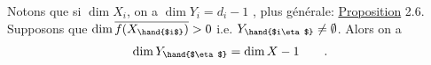 Notons que si  $\dim X_i$,  on a $\dim Y_i = d_i-1$ ,  plus générale:
\uline{Proposition} 2.6. Supposons que  $\dim \overline{f(X_{\hand{$i$}})} > 0$ i.e. $Y_{\hand{$i\eta$}} \neq \emptyset$. Alors on a
\[ \dim Y_{\hand{$\eta$}} = \dim X - 1 \qquad . \]

